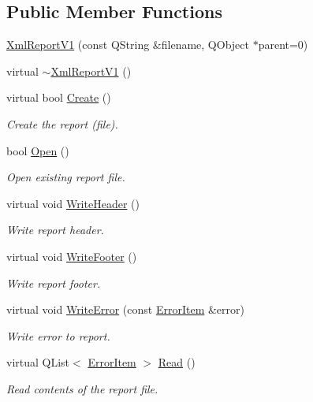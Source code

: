 \subsection*{Public Member Functions}
\begin{DoxyCompactItemize}
\item 
\hyperlink{class_xml_report_v1_ae47ae01e1466ba6935865fba3bafa8e7}{Xml\-Report\-V1} (const Q\-String \&filename, Q\-Object $\ast$parent=0)
\item 
virtual \hyperlink{class_xml_report_v1_a2ef22406ebebf27184bc8b7d4d69fe7c}{$\sim$\-Xml\-Report\-V1} ()
\item 
virtual bool \hyperlink{class_xml_report_v1_a04d31f4d92a27c3b5ab5dbb2770d6a60}{Create} ()
\begin{DoxyCompactList}\small\item\em Create the report (file). \end{DoxyCompactList}\item 
bool \hyperlink{class_xml_report_v1_ac98da3bae4b336d5ed261902e732e8a6}{Open} ()
\begin{DoxyCompactList}\small\item\em Open existing report file. \end{DoxyCompactList}\item 
virtual void \hyperlink{class_xml_report_v1_aaabb02c105b8e3f18718f6c8452da357}{Write\-Header} ()
\begin{DoxyCompactList}\small\item\em Write report header. \end{DoxyCompactList}\item 
virtual void \hyperlink{class_xml_report_v1_a839ee62ed11bf53fed7435c8ca9f4620}{Write\-Footer} ()
\begin{DoxyCompactList}\small\item\em Write report footer. \end{DoxyCompactList}\item 
virtual void \hyperlink{class_xml_report_v1_a5015631f25791df13dfee7ea2a340ba2}{Write\-Error} (const \hyperlink{class_error_item}{Error\-Item} \&error)
\begin{DoxyCompactList}\small\item\em Write error to report. \end{DoxyCompactList}\item 
virtual Q\-List$<$ \hyperlink{class_error_item}{Error\-Item} $>$ \hyperlink{class_xml_report_v1_a409b4db53f957781a1ac63c98bfbf16a}{Read} ()
\begin{DoxyCompactList}\small\item\em Read contents of the report file. \end{DoxyCompactList}\end{DoxyCompactItemize}
